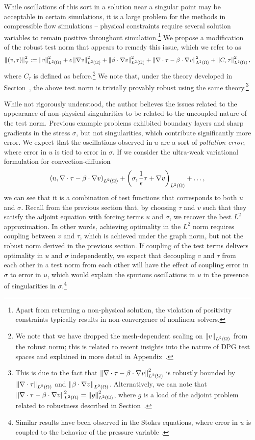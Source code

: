 While oscillations of this sort in a solution near a singular point may be acceptable in certain simulations, it is a large problem for the methods in compressible flow simulations -- physical constraints require several solution variables to remain positive throughout simulation.\footnote{Apart from returning a non-physical solution, the violation of positivity constraints typically results in non-convergence of nonlinear solvers.}  We propose a modification of the robust test norm that appears to remedy this issue, which we refer to as 
\[
\nor{\LRp{v,\tau}}_V^2 \coloneqq \nor{v}^2_{\L} + \epsilon \nor{\grad v}^2_{\L} + \nor{\beta\cdot \Grad v}_{\L}^2 + \nor{\div \tau - \beta\cdot\Grad v}_{\L}^2 + \nor{C_\tau\tau}_{\L}^2,
\]
where $C_\tau$ is defined as before.\footnote{We note that we have dropped the mesh-dependent scaling on $\nor{v}_{\L}$ from the robust norm; this is related to recent insights into the nature of DPG test spaces and explained in more detail in Appendix~.}  We note that, under the theory developed in Section~, the above test norm is trivially provably robust using the same theory.\footnote{This is due to the fact that $\nor{\div \tau - \beta\cdot\Grad v}_{\L}^2$ is robustly bounded by $\nor{\div \tau}_{\L}$ and $\nor{\beta\cdot\Grad v}_{\L}$.  Alternatively, we can note that $\nor{\div \tau - \beta\cdot\Grad v}_{\L}^2 = \nor{g}_{\L}^2$, where $g$ is a load of the adjoint problem related to robustness described in Section~.}

While not rigorously understood, the author believes the issues related to the appearance of non-physical singularities to be related to the uncoupled nature of the test norm.  Previous example problems exhibited boundary layers and sharp gradients in the stress $\sigma$, but not singularities, which contribute significantly more error.  We expect that the oscillations observed in $u$ are a sort of \textit{pollution error}, where error in $u$ is tied to error in $\sigma$.  If we consider the ultra-weak variational formulation for convection-diffusion
\[
\LRp{u,\div \tau - \beta\cdot \grad v}_{\L} + \LRp{\sigma,\frac{1}{\epsilon} \tau + \grad v}_{\L} + \ldots,
\]
we can see that it is a combination of test functions that corresponds to both $u$ and $\sigma$.  Recall from the previous section that, by choosing $\tau$ and $v$ such that they satisfy the adjoint equation with forcing terms $u$ and $\sigma$, we recover the best $L^2$ approximation.  In other words, achieving optimality in the $L^2$ norm requires coupling between $v$ and $\tau$, which is achieved under the graph norm, but not the robust norm derived in the previous section.  If coupling of the test terms delivers optimality in $u$ and $\sigma$ independently, we expect that decoupling $v$ and $\tau$ from each other in a test norm from each other will have the effect of coupling error in $\sigma$ to error in $u$, which would explain the spurious oscillations in $u$ in the presence of singularities in $\sigma$.\footnote{Similar results have been observed in the Stokes equations, where error in $u$ is coupled to the behavior of the pressure variable \cite{FLD:FLD582}.} 


